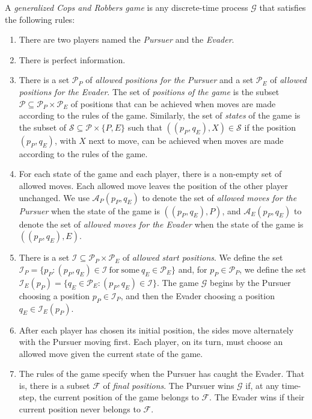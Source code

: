 \documentclass[12pt,reqno]{amsart}
\begin{document}
A \emph{generalized Cops and Robbers game} is any discrete-time process $\mathcal{G}$ that satisfies the following rules:
\begin{enumerate}
\item There are two players named the \emph{Pursuer} and the \emph{Evader}.

\item There is perfect information.

\item There is a set $\mathcal{P}_P$  of \emph{allowed positions for the Pursuer} and a set $\mathcal{P}_E$ of \emph{allowed positions for the Evader}.  The set of \emph{positions of the game} is
    the subset $\mathcal{P} \subseteq \mathcal{P}_P \times \mathcal{P}_E$ of positions that can be achieved when moves are made according to the rules of the game.  Similarly, the set  of
    \emph{states} of the game is the subset of $\mathcal{S} \subseteq \mathcal{P} \times \{P, E\}$ such that $((p_P, q_E), X) \in \mathcal{S}$ if the position $(p_P, q_E)$, with $X$ next to move,
    can be achieved when moves are made according to the rules of the game.

\item For each state of the game and each player, there is a non-empty set of allowed moves. Each allowed move leaves the position of the other player unchanged.  We use $\mathcal{A}_P(p_P, q_E)$
    to denote the set of \emph{allowed moves for the Pursuer} when the state of the game is  $((p_P, q_E), P)$, and $\mathcal{A}_E(p_P, q_E)$ to denote the set of \emph{allowed moves for the
    Evader} when the state of the game is  $((p_P, q_E), E)$.

\item There is a set $\mathcal{I} \subseteq \mathcal{P}_P \times \mathcal{P}_E$ of \emph{allowed start positions}.  We define the set
    $\mathcal{I}_P = \{p_P: (p_P, q_E) \in \mathcal{I}\ \mathrm{for\ some}\ q_E \in \mathcal{P}_E\}$ and, for $p_P \in \mathcal{P}_P$, we define the set $\mathcal{I}_E(p_P) = \{q_E \in
    \mathcal{P}_E: (p_P, q_E) \in \mathcal{I}\}.$ The game $\mathcal{G}$ begins by the Pursuer choosing a position $p_P \in \mathcal{I}_P$, and then the Evader choosing a position $q_E \in
    \mathcal{I}_E(p_P)$.  %

\item After each player has chosen its initial position, the sides move alternately with the Pursuer moving first.  Each player, on its turn, must choose an allowed move given the current state of
    the game.

\item The rules of the game specify when the Pursuer has caught the Evader. That is, there is a subset $\mathcal{F}$ of \emph{final positions}.  The Pursuer wins $\mathcal{G}$ if, at any time-step,
    the current position of the game belongs to $\mathcal{F}$.  The Evader wins if their current position never belongs to $\mathcal{F}$.
\end{enumerate}
\end{document}
